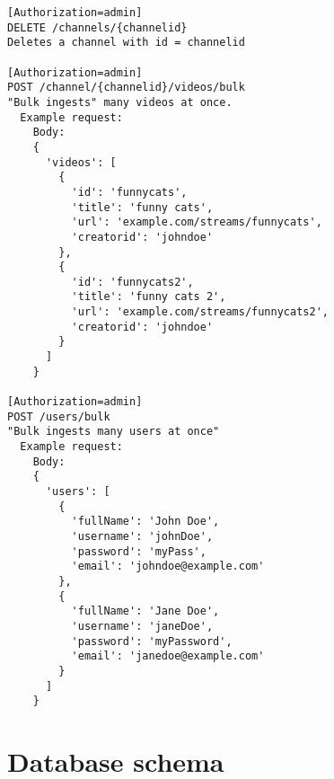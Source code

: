 \documentclass[11pt, a4paper]{article}
\begin{document}
\begin{lstlisting}
[Authorization=admin]
DELETE /channels/{channelid}
Deletes a channel with id = channelid

[Authorization=admin]
POST /channel/{channelid}/videos/bulk
"Bulk ingests" many videos at once.
  Example request:
    Body:
    {
      'videos': [
        {
          'id': 'funnycats',
          'title': 'funny cats',
          'url': 'example.com/streams/funnycats',
          'creatorid': 'johndoe'
        },
        {
          'id': 'funnycats2',
          'title': 'funny cats 2',
          'url': 'example.com/streams/funnycats2',
          'creatorid': 'johndoe'
        }
      ]
    }

[Authorization=admin]
POST /users/bulk
"Bulk ingests many users at once"
  Example request:
    Body:
    {
      'users': [
        {
          'fullName': 'John Doe',
          'username': 'johnDoe',
          'password': 'myPass',
          'email': 'johndoe@example.com'
        },
        {
          'fullName': 'Jane Doe',
          'username': 'janeDoe',
          'password': 'myPassword',
          'email': 'janedoe@example.com'
        }
      ]
    }
		\end{lstlisting}
\newpage
	\section{Database schema}
\end{document}
